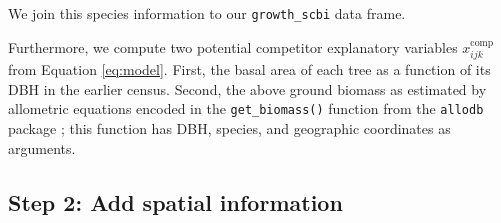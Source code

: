 \documentclass[12pt]{article}
\newenvironment{Shaded}{\begin{snugshade}}{\end{snugshade}}
\newcommand{\AlertTok}[1]{\textcolor[rgb]{0.94,0.16,0.16}{#1}}
\newcommand{\CommentTok}[1]{\textcolor[rgb]{0.56,0.35,0.01}{\textit{#1}}}
\newcommand{\DataTypeTok}[1]{\textcolor[rgb]{0.13,0.29,0.53}{#1}}
\newcommand{\DecValTok}[1]{\textcolor[rgb]{0.00,0.00,0.81}{#1}}
\newcommand{\FloatTok}[1]{\textcolor[rgb]{0.00,0.00,0.81}{#1}}
\newcommand{\KeywordTok}[1]{\textcolor[rgb]{0.13,0.29,0.53}{\textbf{#1}}}
\newcommand{\NormalTok}[1]{#1}
\newcommand{\OperatorTok}[1]{\textcolor[rgb]{0.81,0.36,0.00}{\textbf{#1}}}
\newcommand{\StringTok}[1]{\textcolor[rgb]{0.31,0.60,0.02}{#1}}
\begin{document}
We join this species information to our \texttt{growth\_scbi} data
frame.

\begin{Shaded}
\end{Shaded}

Furthermore, we compute two potential competitor explanatory variables
\(x^{\text{comp}}_{ijk}\) from Equation \ref{eq:model}. First, the basal
area of each tree as a function of its DBH in the earlier census.
Second, the above ground biomass as estimated by allometric equations
encoded in the \texttt{get\_biomass()} function from the \texttt{allodb}
package \citep{allodb_package}; this function has DBH, species, and
geographic coordinates as arguments.

\begin{Shaded}
\end{Shaded}

\hypertarget{spatial-information}{%
\subsection{Step 2: Add spatial information}\label{spatial-information}}
\end{document}
